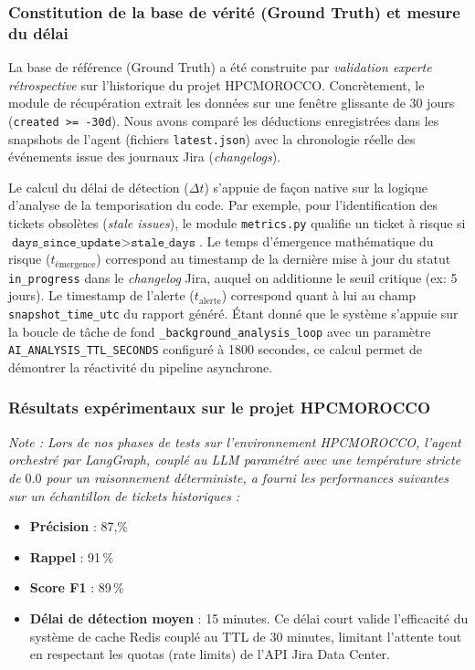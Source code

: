 \subsubsection{Constitution de la base de vérité (Ground Truth) et mesure du délai}
La base de référence (Ground Truth) a été construite par \textit{validation experte rétrospective} sur l'historique du projet HPCMOROCCO. Concrètement, le module de récupération extrait les données sur une fenêtre glissante de 30 jours (\texttt{created >= -30d}). Nous avons comparé les déductions enregistrées dans les snapshots de l'agent (fichiers \texttt{latest.json}) avec la chronologie réelle des événements issue des journaux Jira (\textit{changelogs}).

Le calcul du délai de détection ($\Delta t$) s'appuie de façon native sur la logique d'analyse de la temporisation du code. Par exemple, pour l'identification des tickets obsolètes (\textit{stale issues}), le module \texttt{metrics.py} qualifie un ticket à risque si $\texttt{days\_since\_update} > \texttt{stale\_days}$. 
Le temps d'émergence mathématique du risque ($t_{\text{émergence}}$) correspond au timestamp de la dernière mise à jour du statut \texttt{in\_progress} dans le \textit{changelog} Jira, auquel on additionne le seuil critique (ex: 5 jours). Le timestamp de l'alerte ($t_{\text{alerte}}$) correspond quant à lui au champ \texttt{snapshot\_time\_utc} du rapport généré. Étant donné que le système s'appuie sur la boucle de tâche de fond \texttt{\_background\_analysis\_loop} avec un paramètre \texttt{AI\_ANALYSIS\_TTL\_SECONDS} configuré à 1800 secondes, ce calcul permet de démontrer la réactivité du pipeline asynchrone.

\subsubsection{Résultats expérimentaux sur le projet HPCMOROCCO}
\textit{Note : Lors de nos phases de tests sur l'environnement HPCMOROCCO, l'agent orchestré par LangGraph, couplé au LLM paramétré avec une température stricte de $0.0$ pour un raisonnement déterministe, a fourni les performances suivantes sur un échantillon de tickets historiques :}

\begin{itemize}
    \renewcommand{\labelitemi}{—}
    \item \textbf{Précision} : 87,\% 
    \item \textbf{Rappel} : 91\,\%
    \item \textbf{Score F1} : 89\,\%
    \item \textbf{Délai de détection moyen} : 15 minutes. Ce délai court valide l'efficacité du système de cache Redis couplé au TTL de 30 minutes, limitant l'attente tout en respectant les quotas (rate limits) de l'API Jira Data Center.
\end{itemize}

